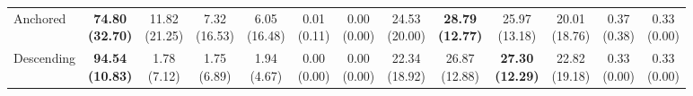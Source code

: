 {\begin{tabular}{l|cccccc|cccccc}
Anchored & {\cellcolor[HTML]{C8E6C9}} \bfseries \makecell{74.80 \\ (32.70)} & \makecell{11.82 \\ (21.25)} & \makecell{7.32 \\ (16.53)} & \makecell{6.05 \\ (16.48)} & \makecell{0.01 \\ (0.11)} & \makecell{0.00 \\ (0.00)} & {\cellcolor[HTML]{C8E6C9}} \makecell{24.53 \\ (20.00)} & \bfseries \makecell{28.79 \\ (12.77)} & \makecell{25.97 \\ (13.18)} & \makecell{20.01 \\ (18.76)} & \makecell{0.37 \\ (0.38)} & \makecell{0.33 \\ (0.00)} \\
Descending & {\cellcolor[HTML]{C8E6C9}} \bfseries \makecell{94.54 \\ (10.83)} & \makecell{1.78 \\ (7.12)} & \makecell{1.75 \\ (6.89)} & \makecell{1.94 \\ (4.67)} & \makecell{0.00 \\ (0.00)} & \makecell{0.00 \\ (0.00)} & {\cellcolor[HTML]{C8E6C9}} \makecell{22.34 \\ (18.92)} & \makecell{26.87 \\ (12.88)} & \bfseries \makecell{27.30 \\ (12.29)} & \makecell{22.82 \\ (19.18)} & \makecell{0.33 \\ (0.00)} & \makecell{0.33 \\ (0.00)} \\
\bottomrule
\end{tabular}
}%
